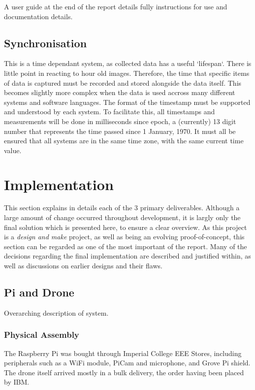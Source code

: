 \documentclass{article}
\begin{document}
A user guide at the end of the report details fully instructions for use and documentation details.

\subsection{Synchronisation}
This is a time dependant system, as collected data has a useful `lifespan`. There is little point in reacting to hour old images. Therefore, the time that specific items of data is captured must be recorded and stored alongside the data itself. This becomes slightly more complex when the data is used accross many different systems and software languages. The format of the timestamp must be supported and understood by each system. To facilitate this, all timestamps and measurements will be done in milliseconds since epoch, a (currently) 13 digit number that represents the time passed since 1 January, 1970. It must all be ensured that all systems are in the same time zone, with the same current time value.

\section{Implementation}
This section explains in details each of the 3 primary deliverables. Although a large amount of change occurred throughout development, it is largly only the final solution which is presented here, to ensure a clear overview. As this project is a \textit{design and make} project, as well as being an evolving proof-of-concept, this section can be regarded as one of the most important of the report. Many of the decisions regarding the final implementation are described and justified within, as well as discussions on earlier designs and their flaws. 
 
\subsection{Pi and Drone}
Overarching description of system.


\subsubsection{Physical Assembly}
The Raspberry Pi was bought through Imperial College EEE Stores, including peripherals such as a WiFi module, PiCam and microphone, and Grove Pi shield. The drone itself arrived mostly in a bulk delivery, the order having been placed by IBM. 
\end{document}
